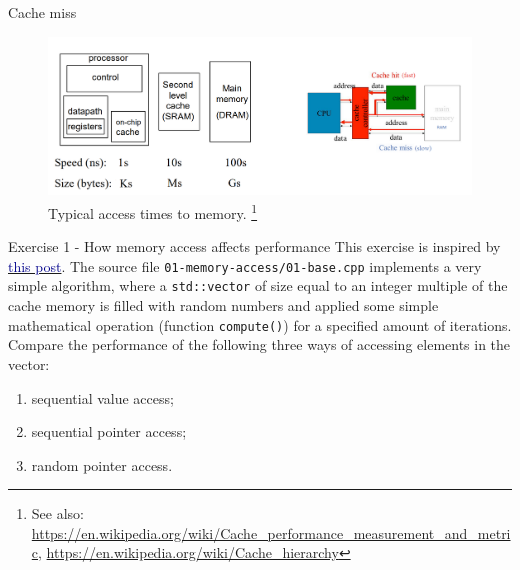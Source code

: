 \documentclass[10pt,aspectratio=169]{beamer}
\begin{document}
\begin{frame}{Cache miss}
    \begin{figure}
        \centering
        \includegraphics[width=\textwidth]{images/cache.png}
        \caption{Typical access times to memory. \footnote{See also: \url{https://en.wikipedia.org/wiki/Cache_performance_measurement_and_metric}, \url{https://en.wikipedia.org/wiki/Cache_hierarchy}}}
    \end{figure}
\end{frame}

\begin{frame}{Exercise 1 - How memory access affects performance}
    This exercise is inspired by \href{https://bitbashing.io/memory-performance.html}{\textcolor{DarkBlue}{this post}}.
    \vfill
    The source file \texttt{01-memory-access/01-base.cpp} implements a very simple algorithm, where a \texttt{std::vector} of size equal to an integer multiple of the cache memory is filled with random numbers and applied some simple mathematical operation (function \texttt{compute()}) for a specified amount of iterations.
    \vfill
    Compare the performance of the following three ways of accessing elements in the vector:
    \begin{enumerate}
        \item sequential value access;
        \item sequential pointer access;
        \item random pointer access.
    \end{enumerate}
\end{frame}
\end{document}
